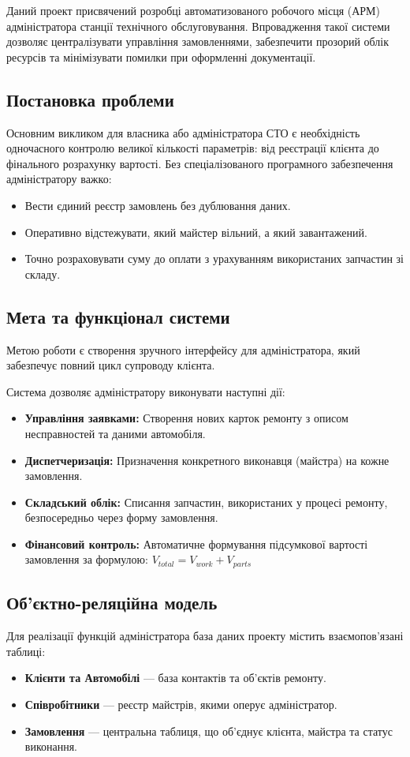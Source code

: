 
Даний проект присвячений розробці автоматизованого робочого місця (АРМ) адміністратора станції технічного обслуговування. Впровадження такої системи дозволяє централізувати управління замовленнями, забезпечити прозорий облік ресурсів та мінімізувати помилки при оформленні документації.

\subsection{Постановка проблеми}
Основним викликом для власника або адміністратора СТО є необхідність одночасного контролю великої кількості параметрів: від реєстрації клієнта до фінального розрахунку вартості. Без спеціалізованого програмного забезпечення адміністратору важко:
\begin{itemize}
    \item Вести єдиний реєстр замовлень без дублювання даних.
    \item Оперативно відстежувати, який майстер вільний, а який завантажений.
    \item Точно розраховувати суму до оплати з урахуванням використаних запчастин зі складу.
\end{itemize}

\subsection{Мета та функціонал системи}
Метою роботи є створення зручного інтерфейсу для адміністратора, який забезпечує повний цикл супроводу клієнта. 

Система дозволяє адміністратору виконувати наступні дії:
\begin{itemize}
    \item \textbf{Управління заявками:} Створення нових карток ремонту з описом несправностей та даними автомобіля.
    \item \textbf{Диспетчеризація:} Призначення конкретного виконавця (майстра) на кожне замовлення.
    \item \textbf{Складський облік:} Списання запчастин, використаних у процесі ремонту, безпосередньо через форму замовлення.
    \item \textbf{Фінансовий контроль:} Автоматичне формування підсумкової вартості замовлення за формулою: $V_{total} = V_{work} + V_{parts}$
\end{itemize}

\subsection{Об'єктно-реляційна модель}
Для реалізації функцій адміністратора база даних проекту містить взаємопов'язані таблиці:
\begin{itemize}
    \item \textbf{Клієнти та Автомобілі} — база контактів та об'єктів ремонту.
    \item \textbf{Співробітники} — реєстр майстрів, якими оперує адміністратор.
    \item \textbf{Замовлення} — центральна таблиця, що об'єднує клієнта, майстра та статус виконання.
\end{itemize}
